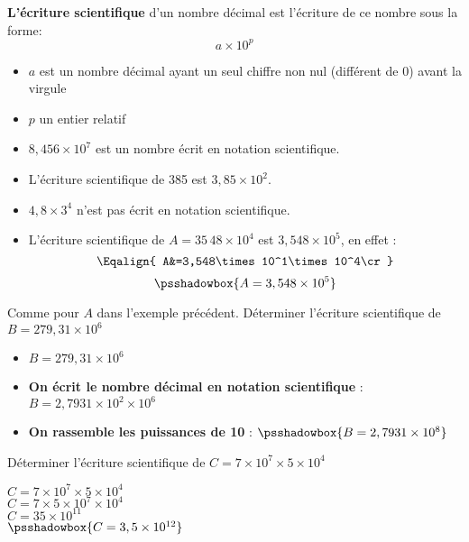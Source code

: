 \begin{definition}
\textbf{L'écriture scientifique} d'un nombre décimal est l'écriture de ce nombre sous la forme:
 $$a\times10^p$$
    \begin{itemize}  
        \item $a$ est un nombre décimal ayant un seul chiffre non nul (différent de 0) avant la virgule
        \item $p$ un entier relatif
    \end{itemize}
\end{definition}

\begin{exemple*1}    
    \begin{itemize}
        \item $8,456\times 10^7$ est un nombre écrit en notation scientifique.
        \item L'écriture scientifique de 385 est $3,85\times10^2$.
        \item $4,8\times 3^4$ n'est pas écrit en notation scientifique.
        \item  L'écriture scientifique de $A=35\,48\times10^4$ est $3,548\times10^5$, en effet :
        $$\Eqalign{
        A&=3,548\times10^1\times10^4\cr
        }$$
        $$\psshadowbox{A=3,548\times10^5}$$
    \end{itemize}

\end{exemple*1}

\begin{methode*1}
    Comme pour $A$ dans l'exemple précédent.
    \exercice
    Déterminer l'écriture scientifique de $B = 279,31\times10^6$
    \correction
    \begin{itemize}
        \item $B = 279,31\times10^6$
        \item \textbf{On écrit le nombre décimal en notation scientifique} : $B = 2,7931\times 10^2 \times10^6$
        \item \textbf{On rassemble les puissances de 10} : $\psshadowbox{B = 2,7931\times 10^8}$
    \end{itemize}
\end{methode*1}

\begin{methode*1}
    \exercice
    Déterminer l'écriture scientifique de $C=7\times 10^7 \times 5 \times 10^4$
    \correction

    $C=7\times 10^7 \times 5 \times 10^4$\\
    $C=7 \times 5 \times 10^7 \times 10^4$\\
    $C=35 \times 10^{11}$\\ 
    $\psshadowbox{C=3,5 \times 10^{12}}$ 
\end{methode*1}

